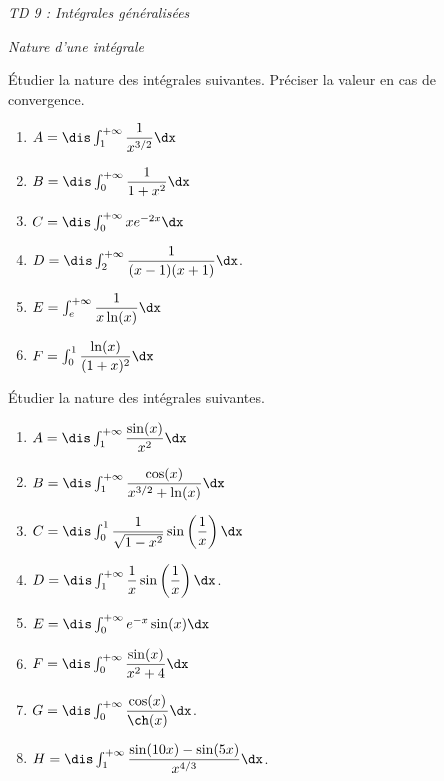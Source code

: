 \documentclass[a4paper,10pt]{report}
\begin{document}
\everymath{\displaystyle}
\begin{center}
\textit{{ {\huge TD 9 : Intégrales généralisées}}}
\end{center}


\bigskip

\begin{center}
\textit{{ {\large Nature d'une intégrale}}}
\end{center}

\medskip

\begin{Exa} Étudier la nature des intégrales suivantes. Préciser la valeur en cas de convergence.

\begin{multicols}{2}
\begin{enumerate}
\item $A = \dis \int_1^{+ \infty} \dfrac{1}{x^{3/2}} \dx$
\item $B = \dis \int_0^{+ \infty} \dfrac{1}{1+x^2} \dx$
\item $C = \dis \int_0^{+ \infty} x e^{-2x} \dx$
\item $D= \dis \int_2^{+ \infty} \dfrac{1}{(x-1)(x+1)} \dx$.
\item $E= \int_{e}^{+ \infty} \dfrac{1}{x\ln(x)} \dx$
\item $F= \int_0^1 \dfrac{\ln(x)}{(1+x)^2} \dx$
\end{enumerate}
\end{multicols}
\vspace{0.1cm}
\end{Exa}



\begin{Exa} Étudier la nature des intégrales suivantes. 

\begin{multicols}{2}
\begin{enumerate}
\item $A = \dis \int_1^{+ \infty} \dfrac{\sin(x)}{x^2} \dx$
\item $B = \dis \int_1^{+ \infty} \dfrac{\cos(x)}{x^{3/2}+\ln(x)} \dx$
\item $C = \dis \int_0^{1} \dfrac{1}{\sqrt{1-x^2}} \sin \left(\dfrac{1}{x}\right) \dx$
\item $D= \dis \int_1^{+ \infty} \dfrac{1}{x} \sin \left(\dfrac{1}{x}\right) \dx$.
\item $E= \dis \int_{0}^{+ \infty} e^{-x} \sin(x) \dx$
\item $F= \dis \int_0^{+\infty} \dfrac{\sin(x)}{x^2+4} \dx$
\item $G= \dis \int_0^{+ \infty} \dfrac{\cos(x)}{\ch(x)} \dx$.
\item $H= \dis \int_1^{+\infty} \dfrac{\sin(10x)-\sin(5x)}{x^{4/3}} \dx$.
\end{enumerate}
\end{multicols}
\vspace{0.1cm}
\end{Exa}
\end{document}
